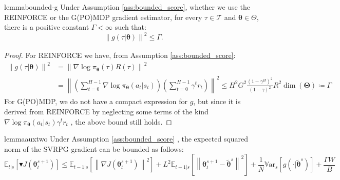 \documentclass{article}
\theoremstyle{remark}
\theoremstyle{definition}
\newcommand{\norm}[2][\infty]{\left\|#2\right\|_{#1}}
\newcommand{\vtheta}{\boldsymbol{\theta}}
\newcommand{\Tspace}{\mathcal{T}}
\newcommand{\score}[2]{\nabla\log\pi_{#1}(#2)}
\newcommand{\vTheta}{\boldsymbol{\Theta}}
\newcommand{\gradJ}[1]{\nabla J(#1)}
\newcommand{\Ets}[2][t]{\mathbb{E}_{#1\vert s}\left[#2\right]}
\newcommand{\Vars}[1]{{\mathbb{V}\text{ar}}_{s}\left[#1\right]}
\newcommand{\gradBlack}[1]{\blacktriangledown J(#1)}
\newcommand{\VARIS}{W}
\begin{document}
\begin{restatable}[]{lemma}{bounded-g}\label{lemma:gbound}
Under Assumption \ref{ass:bounded_score}, whether we use the REINFORCE or the G(PO)MDP gradient estimator, for every $\tau\in\Tspace$ and $\vtheta\in\Theta$, there is a positive constant $\Gamma<\infty$ such that:
\[
	\norm[]{g(\tau\vert\vtheta)}^2 \leq \Gamma.
\]
\end{restatable}
\begin{proof}
For REINFORCE we have, from Assumption \ref{ass:bounded_score}:
\begin{align*}
	\norm[]{g(\tau\vert\vtheta)}^2 &=
	\norm[]{\score{\vtheta}{\tau}R(\tau)}^2 \\
	&=\norm[]{\left(\sum_{t=0}^{H-1}\score{\vtheta}{a_t\vert s_t}\right)\left(\sum_{t=0}^{H-1}\gamma^t r_t\right)}^2\leq H^2G^2\frac{(1-\gamma^H)^2}{(1-\gamma)^2}R^2\dim(\vTheta) \coloneqq \Gamma
\end{align*}
For G(PO)MDP, we do not have a compact expression for $g$, but since it is derived from REINFORCE by neglecting some terms of the kind $\score{\vtheta}{a_t\vert s_t}\gamma^t r_t$ \cite{baxter2001infinite}\cite{peters2008reinforcement}, the above bound still holds.
\end{proof}
\begin{restatable}[]{lemma}{auxtwo}\label{lemma:aux2}
Under Assumption \ref{ass:bounded_score}
, the expected squared norm of the SVRPG gradient can be bounded as follows:
\[
\Ets{\gradBlack{\vtheta_t^{s+1}}} \leq
\Ets[t-1]{\norm[]{\gradJ{\vtheta_t^{s+1}}}^2} 
+L^2\Ets[t-1]{\norm[]{\vtheta_t^{s+1}-\tilde{\vtheta}^s}^2}
+\frac{1}{N}\Vars{g(\cdot\vert\tilde{\vtheta}^s)}
\nonumber 
+\frac{\Gamma\VARIS}{B}
\]
\end{restatable}
\end{document}

